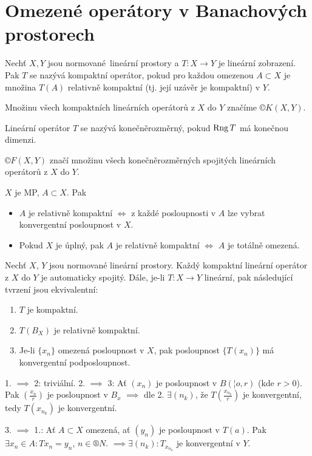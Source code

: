 \documentclass[12pt]{article}					%
\begin{document}
\section{Omezené operátory v Banachových prostorech}
\begin{definice}
	Nechť $X, Y$ jsou normované lineární prostory a $T: X \rightarrow Y$ je lineární zobrazení. Pak $T$ se nazývá kompaktní operátor, pokud pro každou omezenou $A \subset X$ je množina $T(A)$ relativně kompaktní (tj. její uzávěr je kompaktní) v $Y$.

	Množinu všech kompaktních lineárních operátorů z $X$ do $Y$ značíme $©K(X, Y)$.

	Lineární operátor $T$ se nazývá konečněrozměrný, pokud $\operatorname{Rng} T$ má konečnou dimenzi.

	$©F(X, Y)$ značí množinu všech konečněrozměrných spojitých lineárních operátorů z $X$ do $Y$.
\end{definice}

\begin{poznamka}
	$X$ je MP, $A \subset X$. Pak

	\begin{itemize}
		\item $A$ je relativně kompaktní $\Leftrightarrow$ z každé posloupnosti v $A$ lze vybrat konvergentní posloupnost v $X$.
		\item Pokud $X$ je úplný, pak $A$ je relativně kompaktní $\Leftrightarrow$ $A$ je totálně omezená.
	\end{itemize}
\end{poznamka}

\begin{tvrzeni}
	Nechť $X$, $Y$ jsou normované lineární prostory. Každý kompaktní lineární operátor z $X$ do $Y$ je automaticky spojitý. Dále, je-li $T: X \rightarrow Y$ lineární, pak následující tvrzení jsou ekvivalentní:

	\begin{enumerate}
		\item $T$ je kompaktní.
		\item $T(B_X)$ je relativně kompaktní.
		\item Je-li $\{x_n\}$ omezená posloupnost v $X$, pak posloupnost $\{T(x_n)\}$ má konvergentní podposloupnost.
	\end{enumerate}

	\begin{dukazin}
		1. $\implies$ 2: triviální. 2. $\implies$ 3: Ať $(x_n)$ je posloupnost v $B(¦o, r)$ (kde $r > 0$). Pak $(\frac{x_n}{r})$ je posloupnost v $B_x$ $\implies$ dle 2. $\exists (n_k)$, že $T(\frac{x_{n_k}}{r})$ je konvergentní, tedy $T(x_{n_k})$ je konvergentní.

		3. $\implies$ 1.: Ať $A \subset X$ omezená, ať $(y_n)$ je posloupnost v $T(a)$. Pak $\exists x_n \in A: T x_n = y_n$, $n \in ®N$. $\implies \exists (n_k): T_{x_{n_k}}$ je konvergentní v $Y$.
	\end{dukazin}
\end{tvrzeni}
\end{document}
